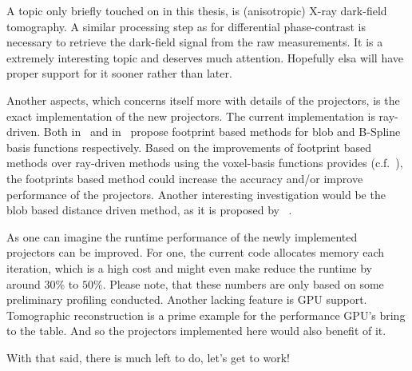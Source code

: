 A topic only briefly touched on in this thesis, is (anisotropic) X-ray dark-field tomography. A
similar processing step as for differential phase-contrast is necessary to retrieve the dark-field
signal from the raw measurements. It is a extremely interesting topic and deserves much attention.
Hopefully elsa will have proper support for it sooner rather than later.

Another aspects, which concerns itself more with details of the projectors, is the exact
implementation of the new projectors. The current implementation is ray-driven. Both
\citeauthor*{kohler_iterative_2011} in~\cite{kohler_iterative_2011} and
\citeauthor*{momey_spline_2015} in~\cite{momey_spline_2015} propose footprint based methods for blob
and B-Spline basis functions respectively. Based on the improvements of footprint based methods over
ray-driven methods using the voxel-basis functions provides (c.f.\ \cite{long_3d_2010}), the
footprints based method could increase the accuracy and/or improve performance of the projectors.
Another interesting investigation would be the blob based distance driven method, as it is proposed
by \citeauthor*{levakhina_distance-driven_2010}~\cite{levakhina_distance-driven_2010}.

As one can imagine the runtime performance of the newly implemented projectors can be improved. For
one, the current code allocates memory each iteration, which is a high cost and might even make
reduce the runtime by around \(30\%\) to \(50\%\). Please note, that these numbers are only based on
some preliminary profiling conducted. Another lacking feature is GPU support. Tomographic
reconstruction is a prime example for the performance GPU's bring to the table. And so the
projectors implemented here would also benefit of it.

\begin{flushright}
	With that said, there is much left to do, let's get to work!
\end{flushright}
